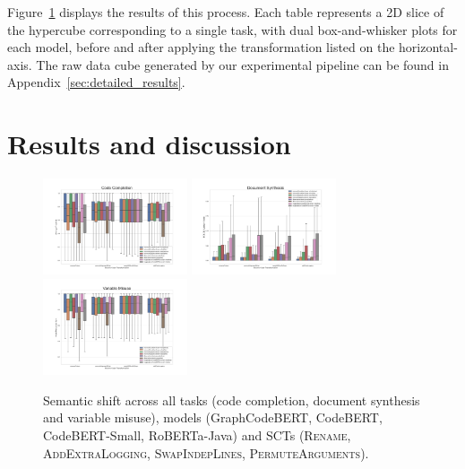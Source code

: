 \documentclass[usenames,dvipsnames]{article} %
\begin{document}
  Figure~\ref{fig:semantic_drift} displays the results of this process. Each table represents a 2D slice of the hypercube corresponding to a single task, with dual box-and-whisker plots for each model, before and after applying the transformation listed on the horizontal-axis. The raw data cube generated by our experimental pipeline can be found in Appendix~\ref{sec:detailed_results}.

  \section{Results and discussion}\label{sec:results}

  \vspace{-10pt}\begin{figure}[H]
          \centering\hspace*{-0.6cm}
          \includegraphics[width=0.38\textwidth]{figs/Code Completion}\hspace*{-0.6cm}
          \includegraphics[width=0.38\textwidth]{figs/Document Synthesis}\hspace*{-0.6cm}
          \includegraphics[width=0.38\textwidth]{figs/Variable Misuse}
          \caption{Semantic shift across all tasks (code completion, document synthesis and variable misuse), models (GraphCodeBERT, CodeBERT, CodeBERT-Small, RoBERTa-Java) and SCTs (\textsc{Rename}, \textsc{AddExtraLogging}, \textsc{SwapIndepLines}, \textsc{PermuteArguments}).}
      \label{fig:semantic_drift}
  \end{figure}
\end{document}
